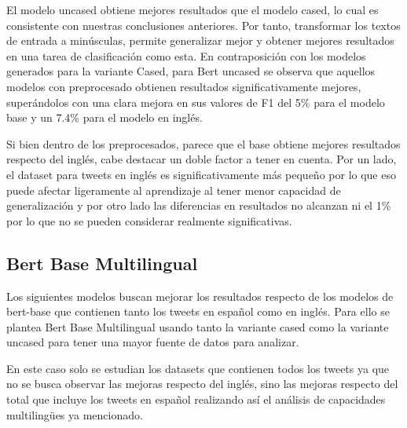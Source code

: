 El modelo uncased obtiene mejores resultados que el modelo cased, lo cual es consistente con nuestras conclusiones anteriores. Por tanto, transformar los textos de entrada a minúsculas, permite generalizar mejor y obtener mejores resultados en una tarea de clasificación como esta. En contraposición con los modelos generados para la variante Cased, para Bert uncased se observa que aquellos modelos con preprocesado obtienen resultados significativamente mejores, superándolos con una clara mejora en sus valores de F1 del 5\% para el modelo base y un 7.4\% para el modelo en inglés.

Si bien dentro de los preprocesados, parece que el base obtiene mejores resultados respecto del inglés, cabe destacar un doble factor a tener en cuenta. Por un lado, el dataset para tweets en inglés es significativamente más pequeño por lo que eso puede afectar ligeramente al aprendizaje al tener menor capacidad de generalización y por otro lado las diferencias en resultados no alcanzan ni el 1\% por lo que no se pueden considerar realmente significativas.

\subsection{Bert Base Multilingual}
Los siguientes modelos buscan mejorar los resultados respecto de los modelos de bert-base que contienen tanto los tweets en español como en inglés. Para ello se plantea Bert Base Multilingual usando tanto la variante cased \cite{bert-base-multilingual-cased} como la variante uncased \cite{bert-base-multilingual-uncased} para tener una mayor fuente de datos para analizar. 

En este caso solo se estudian los datasets que contienen todos los tweets ya que no se busca observar las mejoras respecto del inglés, sino las mejoras respecto del total que incluye los tweets en español realizando así el análisis de capacidades multilingües ya mencionado.

